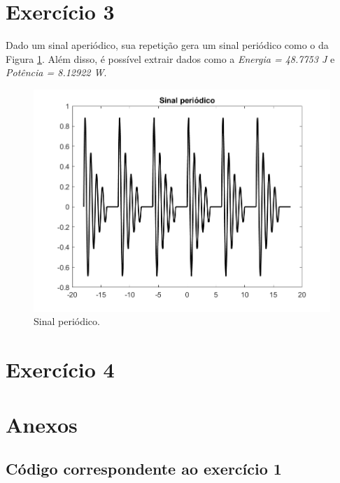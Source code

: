 \documentclass[a4paper,12pt,oneside,openany,table,xcdraw]{article}
\begin{document}
\vspace{0.3cm}
\section{Exercício 3}
Dado um sinal aperiódico, sua repetição gera um sinal periódico como o da Figura \ref{ex3:sinal}. Além disso, é possível extrair dados como a \textit{Energia = 48.7753 J} e \textit{Potência = 8.12922 W}.

\vspace{0.4cm}
\begin{figure}[H]
\centering
\includegraphics[width=14cm]{ex3-sinal}
\caption{Sinal periódico.}
\label{ex3:sinal}
\end{figure}



\vspace{0.3cm}
\section{Exercício 4}

 
\newpage
\section{Anexos}
\subsection{Código correspondente ao exercício 1} \label{anexo:ex1}

\vspace{0.3cm}


\vspace{0.3cm}
\end{document}
